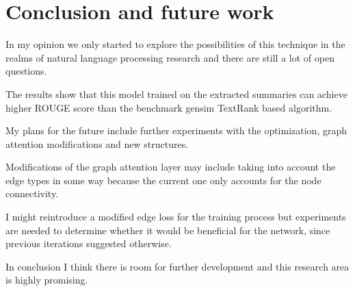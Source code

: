 \chapter{Conclusion and future work}\label{sect:Future}
In my opinion we only started to explore the possibilities of this technique in the realms of natural language processing research and there are still a lot of open questions.

The results show that this model trained on the extracted summaries can achieve higher ROUGE score than the benchmark gensim TextRank based algorithm.

My plans for the future include further experiments with the optimization, graph attention modifications and new structures.

Modifications of the graph attention layer may include taking into account the edge types in some way because the current one only accounts for the node connectivity.

I might reintroduce a modified edge loss for the training process but experiments are needed to determine whether it would be beneficial for the network, since previous iterations suggested otherwise.

In conclusion I think there is room for further development and this research area is highly promising.
